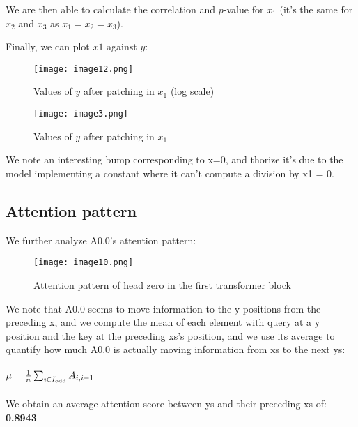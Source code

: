 \documentclass{article}
\begin{document}
We are then able to calculate the correlation and \( p \)-value for \( x_1 \) (it’s the same for \( x_2 \) and \( x_3 \) as \( x_1=x_2=x_3 \)).

Finally, we can plot $x1$ against $y$:

\begin{figure}[htbp]
\centering
\texttt{[image: image12.png]}
\caption{Values of $y$ after patching in $x_1$ (log scale)}
\end{figure}

\newpage

\begin{figure}[htbp]
\centering
\texttt{[image: image3.png]}
\caption{Values of $y$ after patching in $x_1$}
\end{figure}
We note an interesting bump corresponding to x=0, and thorize it’s due to the model implementing a constant where it can’t compute a division by x1 = 0.

\subsection{Attention pattern}
We further analyze A0.0’s attention pattern:
\begin{figure}[htbp]
\centering
\texttt{[image: image10.png]}
\caption{Attention pattern of head zero in the first transformer block}
\end{figure}

We note that A0.0 seems to move information to the y positions from the preceding x, and we compute the mean of each element with query at a y position and the key at the preceding xs’s position, and we use its average to quantify how much A0.0 is actually moving information from xs to the next ys:\\ \\
$\mu=\frac{1}{n} \sum_{i \in I_{\mbox{\tiny odd}}} A_{i, i-1}$\\ \\
We obtain an average attention score between ys and their preceding xs of: \textbf{0.8943}
\end{document}
